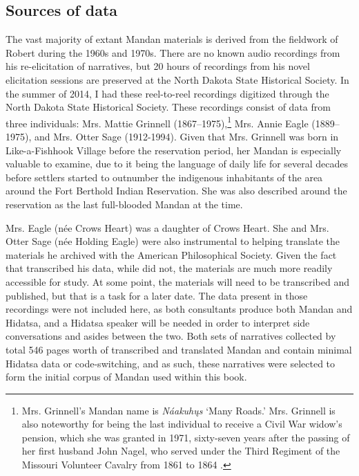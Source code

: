 \subsection{Sources of data}

The vast majority of extant Mandan materials is derived from the fieldwork of Robert \citet{hollow1973a,hollow1973b} during the 1960s and 1970s. There are no known audio recordings from his re-elicitation of  narratives, but 20 hours of recordings from his novel elicitation sessions are preserved at the North Dakota State Historical Society. In the summer of 2014, I had these reel-to-reel recordings digitized through the North Dakota State Historical Society. These recordings consist of data from three individuals: Mrs. Mattie Grinnell (1867--1975),\footnote{Mrs. Grinnell's Mandan name is \textit{Náakuhųs} `Many Roads.' Mrs. Grinnell is also noteworthy for being the last individual to receive a Civil War widow's pension, which she was granted in 1971, sixty-seven years after the passing of her first husband John Nagel, who served under the Third Regiment of the Missouri Volunteer Cavalry from 1861 to 1864 \citep{lovett1975}.} Mrs. Annie Eagle (1889--1975), and Mrs. Otter Sage (1912-1994). Given that Mrs. Grinnell was born in Like-a-Fishhook Village before the reservation period, her Mandan is especially valuable to examine, due to it being the language of daily life for several decades before settlers started to outnumber the indigenous inhabitants of the area around the Fort Berthold Indian Reservation. She was also described around the reservation as the last full-blooded Mandan at the time.

Mrs. Eagle (née Crows Heart) was a daughter of Crows Heart. She and Mrs. Otter Sage (née Holding Eagle) were also instrumental to helping \citeauthor{bowers1971} translate the materials he archived with the American Philosophical Society. Given the fact that \citet{hollow1973a,hollow1973b} transcribed his data, while \citet{bowers1971} did not, the \citeauthor{hollow1973a} materials are much more readily accessible for study. At some point, the \citeauthor{bowers1971} materials will need to be transcribed and published, but that is a task for a later date. The data present in those recordings were not included here, as both consultants produce both Mandan and Hidatsa, and a Hidatsa speaker will be needed in order to interpret side conversations and asides between the two. Both sets of narratives collected by \citeauthor{hollow1973a} total 546 pages worth of transcribed and translated Mandan and contain minimal Hidatsa data or code-switching, and as such, these narratives were selected to form the initial corpus of Mandan used within this book.

